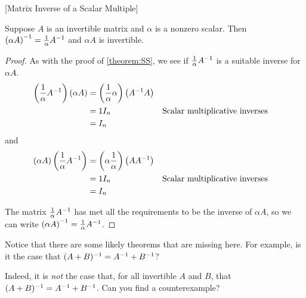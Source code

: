 \documentclass{ximera}
\begin{document}
\begin{theorem}
  \label{theorem:MISM}
  [Matrix Inverse of a Scalar Multiple]

  Suppose $A$ is an invertible matrix and $\alpha$ is a nonzero
  scalar.  Then
  $\left(\alpha A\right)^{-1}=\frac{1}{\alpha}A^{-1}$ and
  $\alpha A$ is invertible.

  \begin{proof}
    As with the proof of \ref{theorem:SS}, we see if $\frac{1}{\alpha}A^{-1}$ is a suitable inverse for $\alpha A$.
    \begin{align*}
      \left(\frac{1}{\alpha}\inverse{A}\right)\left(\alpha A\right)
      &=\left(\frac{1}{\alpha}\alpha\right)\left(\inverse{A}A\right)\\ %
      &=1I_n&&\text{Scalar multiplicative inverses}\\
      &=I_n\\ %
      \end{align*}
      and
      \begin{align*}
              \left(\alpha A\right)\left(\frac{1}{\alpha}\inverse{A}\right)&=
                                                                             \left(\alpha\frac{1}{\alpha}\right)\left(A\inverse{A}\right)\\ %
      &=1I_n&&\text{Scalar multiplicative inverses}\\
      &=I_n\\ %
    \end{align*}

    The matrix $\frac{1}{\alpha}A^{-1}$ has met all the
    requirements to be the inverse of $\alpha A$, so we can write
    $\left(\alpha A\right)^{-1}=\frac{1}{\alpha}A^{-1}$.

  \end{proof}
\end{theorem}

\begin{question}
  Notice that there are some likely theorems that are missing here.  For
  example, is it the case that
  $(A+B)^{-1}=A^{-1}+B^{-1}$?
  \begin{multipleChoice}
  \end{multipleChoice}

  \begin{feedback}[correct]
    Indeed, it is \textit{not} the case that, for all invertible $A$
    and $B$, that $(A+B)^{-1}=A^{-1}+B^{-1}$.  Can you
    find a counterexample?
  \end{feedback}

\end{question}
\end{document}
